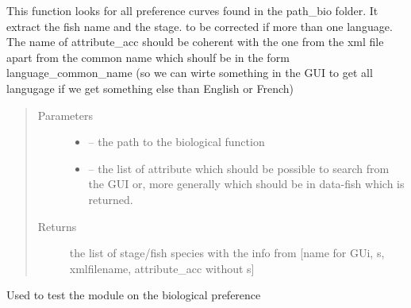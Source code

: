 \documentclass[letterpaper,10pt,english]{sphinxmanual}
\begin{document}
\begin{fulllineitems}
\label{\detokenize{index:src.bio_info.load_xml_name}}
This function looks for all preference curves found in the path\_bio folder. It extract the fish name and the stage.
to be corrected if more than one language. The name of attribute\_acc should be coherent with the one from the xml
file apart from the common name which shoulf be in the form language\_common\_name (so we can wirte something in the
GUI to get all langugage if we get something else than English or French)
\begin{quote}\begin{description}
\item[{Parameters}] \leavevmode\begin{itemize}
\item {} 
 -- the path to the biological function

\item {} 
 -- the list of attribute which should be possible to search from the GUI or, more generally
which should be in data-fish which is returned.

\end{itemize}

\item[{Returns}] \leavevmode
the list of stage/fish species with the info from {[}name for GUi, s, xmlfilename, attribute\_acc without s{]}

\end{description}\end{quote}

\end{fulllineitems}


\begin{fulllineitems}
\label{\detokenize{index:src.bio_info.main}}
Used to test the module on the biological preference

\end{fulllineitems}

\end{document}

